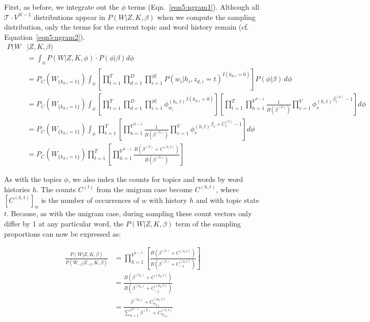 First, as before, we integrate out the $\phi$ terms (Eqn.~\ref{eqn5:ngram1}).  Although all $\mathcal{T}\cdot V^{N-1}$ distributions appear in $P(W|Z,K,\beta)$ when we compute the sampling distribution, only the terms for the current topic and word history remain (cf. Equation~\ref{eqn5:ngram2}).
\begin{align}
P(W&|Z,K,\beta) \\
 &= \int_{\phi} P(W|Z,K,\phi)\cdot P(\phi|\beta) d\phi\\
 &= P_C(W_{\{k_{d,i}=1\}}) \int_{\phi} \left [ \prod_{t=1}^T \prod_{d=1}^D \prod_{i=1}^{|d|} P(w_i|h_i,z_{d,i}=t)^{I(k_{d,i}=0)}  \right ] P(\phi|\beta)\, d\phi \\
&= P_C(W_{\{k_{d,i}=1\}}) \int_{\phi} \left [ \prod_{t=1}^T \prod_{d=1}^D \prod_{i=1}^{|d|} {\phi_{w_i}^{(h_i,t)}}^{I(k_{d,i}=0)}  \right ]  \left [ \prod_{t=1}^T \prod_{h=1}^{V^{N-1}} \frac{1}{B(\beta^{(h)})} \prod_{v=1}^V {\phi_v^{(h,t)}}^{\beta^{(h)}_v-1} \right ]  d\phi\\
&= P_C(W_{\{k_{d,i}=1\}}) \int_{\phi} \prod_{t=1}^T \left [ \prod_{h=1}^{V^{N-1}} \frac{1}{B(\beta^{(h)})} \prod_{v=1}^V {\phi_v^{(h,t)}}^{\beta_v + C^{(t)}_v - 1} \right ]  d\phi\\
&= P_C(W_{\{k_{d,i}=1\}}) \prod_{t=1}^T \left [\prod_{h=1}^{V^{N-1}} \frac{B(\beta^{(h)} + C^{(h,t)})}{B(\beta^{(h)})} \right ] \label{eqn5:ngram1}
\end{align}


As with the topics $\phi$, we also index the counts for topics and words by word histories $h$. The counts $C^{(t)}$ from the unigram case become $C^{(h,t)}$, where $[C^{(h,t)}]_w$ is the number of occurrences of $w$ with history $h$ and with topic state $t$.  Because, as with the unigram case, during sampling these count vectors only differ by 1 at any particular word, the $P(W|Z,K,\beta)$ term of the sampling proportions can now be expressed as:

\begin{align}
\frac{P(W|Z,K,\beta)}{P(W_{-j}|Z_{-j},K,\beta)} &= \prod_{h=1}^{V^{n-1}} \left [ \frac{B(\beta^{(h)} + C^{(h,t)})}{B(\beta^{(h)} + C^{(h,t)}_{-1})} \right ] \label{eqn5:ngram2} \\
&= \frac{B(\beta^{(h_0)} + C^{(h_0,t)})}{B(\beta^{(h_0)} + C^{(h_0,t)}_{-j})} \\
&= \frac{\beta^{(h_0)} + C^{(h_0,t)}_{w_{d,j}}}{\sum_{h=1}^{V^{N-1}} \beta^{(h)} + C^{(h,t)}_{w_{d,j}}} \label{eqn5:ngram3}
\end{align}


